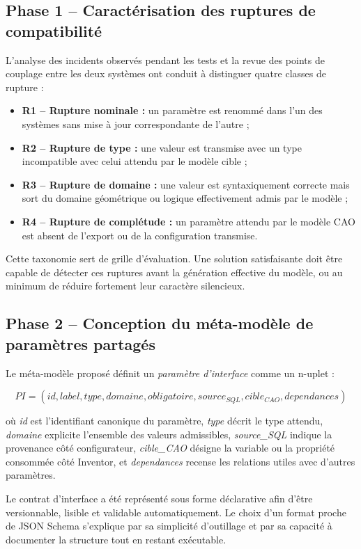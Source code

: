 \subsection{Phase 1 -- Caractérisation des ruptures de compatibilité}

L'analyse des incidents observés pendant les tests et la revue des points de couplage entre les deux systèmes ont conduit à distinguer quatre classes de rupture :

\begin{itemize}[leftmargin=1.4cm]
\item \textbf{R1 -- Rupture nominale :} un paramètre est renommé dans l'un des systèmes sans mise à jour correspondante de l'autre ;
\item \textbf{R2 -- Rupture de type :} une valeur est transmise avec un type incompatible avec celui attendu par le modèle cible ;
\item \textbf{R3 -- Rupture de domaine :} une valeur est syntaxiquement correcte mais sort du domaine géométrique ou logique effectivement admis par le modèle ;
\item \textbf{R4 -- Rupture de complétude :} un paramètre attendu par le modèle CAO est absent de l'export ou de la configuration transmise.
\end{itemize}

Cette taxonomie sert de grille d'évaluation. Une solution satisfaisante doit être capable de détecter ces ruptures avant la génération effective du modèle, ou au minimum de réduire fortement leur caractère silencieux.

\subsection{Phase 2 -- Conception du méta-modèle de paramètres partagés}

Le méta-modèle proposé définit un \textit{paramètre d'interface} comme un n-uplet :

\[
PI = (id, label, type, domaine, obligatoire, source_{SQL}, cible_{CAO}, dependances)
\]

où \textit{id} est l'identifiant canonique du paramètre, \textit{type} décrit le type attendu, \textit{domaine} explicite l'ensemble des valeurs admissibles, \textit{source\_SQL} indique la provenance côté configurateur, \textit{cible\_CAO} désigne la variable ou la propriété consommée côté Inventor, et \textit{dependances} recense les relations utiles avec d'autres paramètres.

Le contrat d'interface a été représenté sous forme déclarative afin d'être versionnable, lisible et validable automatiquement. Le choix d'un format proche de JSON Schema s'explique par sa simplicité d'outillage et par sa capacité à documenter la structure tout en restant exécutable.

